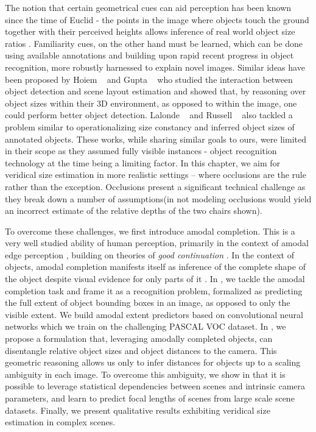 The notion that certain geometrical cues can aid perception has been known since the time of Euclid - the points in the image where objects touch the ground together with their perceived heights allows inference of real world object size ratios \cite{burton45}. Familiarity cues, on the other hand must be learned, which can be done using available annotations and building upon rapid recent progress in object recognition, more robustly harnessed to explain novel images. Similar ideas have been proposed by Hoiem \etal~\cite{hoiem2008putting,Hoiem:book} and Gupta \etal ~\cite{gupta2010blocks} who studied the interaction between object detection and scene layout estimation and showed that, by reasoning over object sizes within their 3D environment, as opposed to within the image, one could perform better object detection. Lalonde \etal~\cite{lalonde2007photo} and Russell \etal~\cite{russell2009building} also tackled a problem similar to operationalizing size constancy and inferred object sizes of annotated objects. These works, while sharing similar goals to ours, were limited in their scope as they assumed fully visible instances - object recognition technology at the time being a limiting factor. In this chapter, we aim for veridical size estimation in more realistic settings -- where occlusions are the rule rather than the exception. Occlusions present a significant technical challenge as they break down a number of assumptions(\eg in 
 not modeling occlusions would yield an incorrect estimate of the relative depths of the two chairs shown).

To overcome these challenges, we first introduce amodal completion. This is a very well studied ability of human perception, primarily in the context of amodal edge perception \cite{kanizsa1979organization}, building on theories of \textit{good continuation} \cite{shipley2001fragments}. In the context of objects, amodal completion manifests itself as inference of the complete shape of the object despite visual evidence for only parts of it \cite{breckon2005amodal}.
In , we tackle the amodal completion task and frame it as a recognition problem, formalized as  predicting the full extent of object bounding boxes in an image, as opposed to only the visible extent. We build amodal extent predictors based on convolutional neural networks which we train on the challenging PASCAL VOC dataset. In , we propose a formulation that, leveraging amodally completed objects, can disentangle relative object sizes and object distances to the camera. This geometric reasoning allows us only to infer distances for objects up to a scaling ambiguity in each image. To overcome this ambiguity, we show in  that it is possible to leverage statistical dependencies between scenes and intrinsic camera parameters, and learn to predict focal lengths of scenes from large scale scene datasets. Finally, we present qualitative  results exhibiting veridical size estimation in complex scenes.


